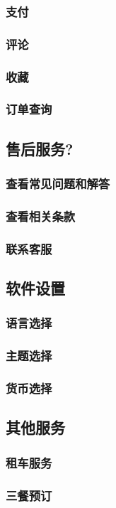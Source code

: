 \documentclass[11pt]{article}
\begin{document}
		\subsubsection{支付}
		\subsubsection{评论}
		\subsubsection{收藏}
		\subsubsection{订单查询}
	
	\subsection{售后服务?}
		\subsubsection{查看常见问题和解答}
		\subsubsection{查看相关条款}
		\subsubsection{联系客服}
	\subsection{软件设置}
		\subsubsection{语言选择}
		\subsubsection{主题选择}
		\subsubsection{货币选择}
	\subsection{其他服务}
		\subsubsection{租车服务}
		\subsubsection{三餐预订}
\end{document}
